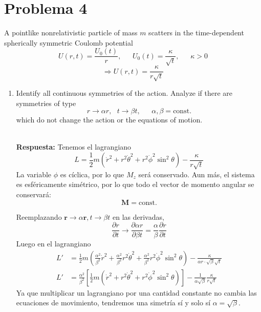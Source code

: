 \documentclass[]{article}
\numberwithin{equation}{section}
\newcommand{\0}{\textcolor{gray}{0}}
\newcommand{\rv}{\mathbf{r}}
\newcommand{\pd}[2]{\dfrac{\partial #1}{\partial #2}}
\newcommand{\n}[1]{\mathbf{#1}}
\newcommand{\resp}{
	\\
	
	\textbf{Respuesta:} }
\begin{document}
\section{Problema 4}
A pointlike nonrelativistic particle of mass $m$ scatters in the time-dependent spherically symmetric Coulomb potential
\begin{equation}
	U(r,t) = \frac{U_0(t)}{r}, ~~~~~~~ U_0(t) = \frac{\kappa}{\sqrt{t}}, ~~~~~~~ \kappa > 0 \label{eq 4.1}
\end{equation}
\begin{equation}
	\Rightarrow U(r,t) = \frac{\kappa}{r \sqrt{t}}
\end{equation}

\begin{enumerate}
	\item[(a)] Identify all continuous symmetries of the action. Analyze if there are symmetries of type
	\begin{equation}
		r \rightarrow \alpha r, ~~~ t \rightarrow \beta t, ~~~~~~~ \alpha, \beta = \mathrm{const.}
	\end{equation}
	which do not change the action or the equations of motion.
	\resp Tenemos el lagrangiano
	\begin{equation}
		L = \frac{1}{2}m \left(\dot{r}^2 + r^2 \dot{\theta}^2 + r^2\dot{\phi}^2 \sin^2 \theta \right) - \frac{\kappa}{r \sqrt{t}}
	\end{equation}
	La variable $\phi$ es cíclica, por lo que $M_z$ será conservado. Aun más, el sistema es esféricamente simétrico, por lo que todo el vector de momento angular se conservará:
	\begin{equation}
		\n{M} = \mathrm{const.}
	\end{equation}
	
	Reemplazando $\rv \rightarrow \alpha \rv, t\rightarrow \beta t$ en las derivadas,
	\begin{equation}
		\pd{r}{t} \rightarrow \pd{\alpha r}{\beta t} = \frac{\alpha}{\beta} \pd{r}{t}
	\end{equation}
	Luego en el lagrangiano
	\begin{align*}
		L' &= \frac{1}{2}m \left(\frac{\alpha^2}{\beta^2} \dot{r}^2 + \frac{\alpha^2}{\beta^2} r^2 \dot{\theta}^2 + \frac{\alpha^2}{\beta^2} r^2\dot{\phi}^2 \sin^2 \theta \right) - \frac{\kappa}{\alpha r \cdot \sqrt{\beta} \sqrt{t}} \\
		L' &= \frac{\alpha^2}{\beta^2} \left[\frac{1}{2}m \left(\dot{r}^2 + r^2 \dot{\theta}^2 + r^2\dot{\phi}^2 \sin^2 \theta \right)\right] - \frac{1}{\alpha \sqrt{\beta}} \frac{\kappa}{r \sqrt{t}}
	\end{align*}
	Ya que multiplicar un lagrangiano por una cantidad constante no cambia las ecuaciones de movimiento, tendremos una simetría sí y solo sí $\alpha = \sqrt{\beta}$.
	

\end{enumerate}
\end{document}

